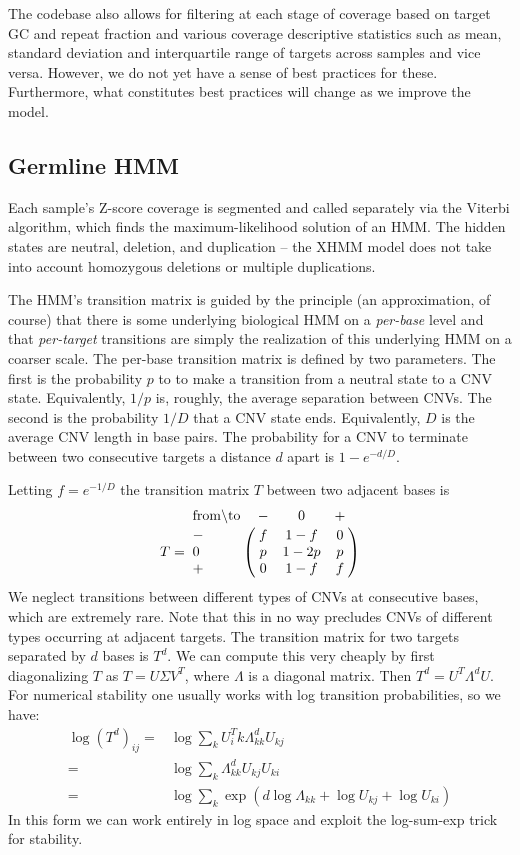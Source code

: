 \documentclass[nofootinbib,amssymb,amsmath]{revtex4}
\begin{document}
The codebase also allows for filtering at each stage of coverage based on target GC and repeat fraction and various coverage descriptive statistics such as mean, standard deviation and interquartile range of targets across samples and vice versa.  However, we do not yet have a sense of best practices for these.  Furthermore, what constitutes best practices will change as we improve the model.

\subsection{Germline HMM} \label{germline-hmm}
Each sample's Z-score coverage is segmented and called separately via the Viterbi algorithm, which finds the maximum-likelihood solution of an HMM.  The hidden states are neutral, deletion, and duplication -- the XHMM model does not take into account homozygous deletions or multiple duplications.  

The HMM's transition matrix is guided by the principle (an approximation, of course) that there is some underlying biological HMM on a \textit{per-base} level and that \textit{per-target} transitions are simply the realization of this underlying HMM on a coarser scale.  The per-base transition matrix is defined by two parameters.  The first is the probability $p$ to to make a transition from a neutral state to a CNV state.  Equivalently, $1/p$ is, roughly, the average separation between CNVs.  The second is the probability $1/D$ that a CNV state ends.  Equivalently, $D$ is the average CNV length in base pairs.   The probability for a CNV to terminate between two consecutive targets a distance $d$ apart is $1 - e^{-d/D}$.
  
Letting $f = e^{-1/D}$ the transition matrix $T$ between two adjacent bases is
%
\begin{equation}
T = \bordermatrix{ {\rm from} \backslash {\rm to} & - & 0 & + \cr
      - & f & 1-f & 0 \cr
      0 & p & 1-2p & p \cr
      + & 0 & 1-f & f}
\end{equation}
%
We neglect transitions between different types of CNVs at consecutive bases, which are extremely rare.  Note that this in no way precludes CNVs of different types occurring at adjacent targets.  The transition matrix for two targets separated by $d$ bases is $T^d$.  We can compute this very cheaply by first diagonalizing $T$ as $T = U \Sigma V^T$, where $\Lambda$ is a diagonal matrix.  Then $T^d = U^T \Lambda^d U$.  For numerical stability one usually works with log transition probabilities, so we have:
%
\begin{align}
\log \left(T^d \right)_{ij} =& \log \sum_k U^T_ik \Lambda^d_{kk} U_{kj} \\
            =& \log \sum_k \Lambda^d_{kk} U_{kj} U_{ki} \\ 
            =& \log \sum_k \exp \left( d \log \Lambda_{kk} + \log U_{kj} + \log U_{ki}  \right)
\end{align}
%
In this form we can work entirely in log space and exploit the log-sum-exp trick for stability.
\end{document}
